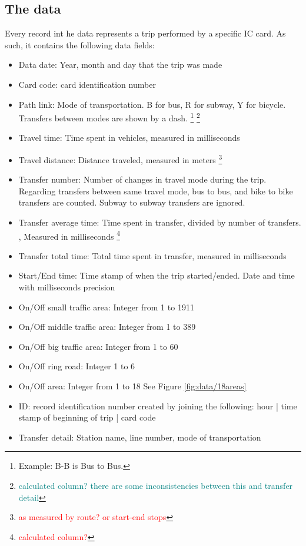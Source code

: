 \documentclass{article}
\newcommand{\selfnote}[1]{\footnote{\textcolor{red}{#1}}}
\newcommand{\domainDoubt}[1]{\footnote{\textcolor{teal}{#1}}}
\begin{document}
\subsection{The data}
\label{sec:data}
Every record int he data represents a trip performed by a specific IC card. As such, it contains the following data fields:

\begin{itemize}
\item Data date: Year, month and day that the trip was made
\item Card code: card identification number
\item Path link: Mode of transportation. B for bus, R for subway, Y for bicycle. Transfers between modes are shown by a dash. \footnote{Example: B-B is Bus to Bus.} \domainDoubt{calculated column? there are some inconsistencies between this and transfer detail}
\item Travel time: Time spent in vehicles, measured in milliseconds
\item Travel distance: Distance traveled, measured in meters \selfnote{as measured by route? or start-end stops}
\item Transfer number: Number of changes in travel mode during the trip. Regarding transfers between same travel mode, bus to bus, and bike to bike transfers are counted. Subway to subway transfers are ignored. 
\item Transfer average time: Time spent in transfer, divided by number of transfers. , Measured in milliseconds \selfnote{calculated column?}
\item Transfer total time: Total time spent in transfer, measured in milliseconds
\item Start/End time: Time stamp of when the trip started/ended. Date and time with milliseconds precision
\item On/Off small traffic area: Integer from 1 to 1911
\item On/Off middle traffic area: Integer from 1 to 389
\item On/Off big traffic area: Integer from 1 to 60
\item On/Off ring road: Integer 1 to 6
\item On/Off area: Integer from 1 to 18 See Figure \ref{fig:data/18areas}
\item ID: record identification number created by joining the following: hour | time stamp of beginning of trip | card code
\item Transfer detail: Station name, line number, mode of transportation
\end{itemize}
\end{document}
